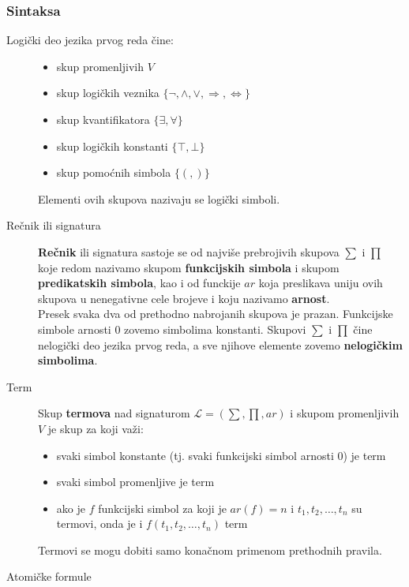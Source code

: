 \documentclass[../main.tex]{subfiles}
\begin{document}
\subsubsection{Sintaksa}
\begin{description}
\item[Logički deo jezika prvog reda čine:] \hfill

\begin{itemize}
	\item skup promenljivih $V$
	\item skup logičkih veznika $\{ \neg, \wedge, \vee, \Rightarrow, \Leftrightarrow \}$
	\item skup kvantifikatora $\{ \exists, \forall \}$
	\item skup logičkih konstanti $\{ \top, \bot \}$
	\item skup pomoćnih simbola $\{ (,  ) \}$
\end{itemize}
Elementi ovih skupova nazivaju se logički simboli.

\item[Rečnik ili signatura] \hfill

{\bf Rečnik} ili signatura sastoje se od najviše prebrojivih skupova $\sum$ i $\prod$ koje redom nazivamo skupom {\bf funkcijskih simbola} i skupom {\bf predikatskih simbola}, kao i od funckije $ar$ koja preslikava uniju ovih skupova u nenegativne cele brojeve i koju nazivamo {\bf arnost}.
\\
Presek svaka dva od prethodno nabrojanih skupova je prazan. Funkcijske simbole arnosti 0 zovemo simbolima konstanti. Skupovi $\sum$ i $\prod$ čine nelogički deo jezika prvog reda, a sve njihove elemente zovemo {\bf nelogičkim simbolima}.

\item[Term] \hfill

Skup {\bf termova} nad signaturom $\mathcal{L} = (\sum, \prod, ar)$ i skupom promenljivih $V$ je skup za koji važi:
\begin{itemize}
	\item svaki simbol konstante (tj. svaki funkcijski simbol arnosti 0) je term
	\item svaki simbol promenljive je term
	\item ako je $f$ funkcijski simbol za koji je $ar(f) = n$ i $t_1,t_2, \ldots, t_n$ su termovi, onda je i $f(t_1, t_2, \ldots, t_n)$ term
\end{itemize}
Termovi se mogu dobiti samo konačnom primenom prethodnih pravila.

\item[Atomičke formule] \hfill


\end{description}
\end{document}

